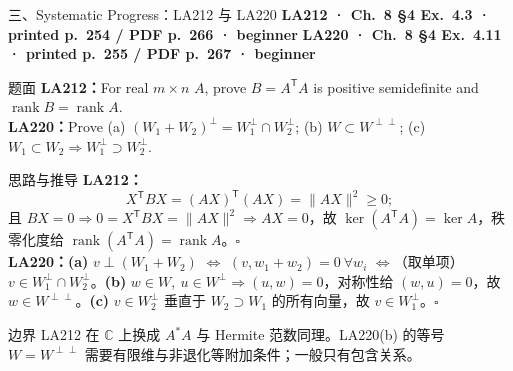 \documentclass[aspectratio=169,10pt,fontset=none]{ctexbeamer}
\newcommand{\ex}[1]{\textcolor{accent}{\footnotesize\bfseries #1}}
\begin{document}
\begin{frame}[t]{三、Systematic Progress：LA212 与 LA220}
  \leavevmode\ex{LA212 · Ch.~8 §4 Ex.~4.3 · printed p.~254 / PDF p.~266 · beginner}\quad
  \ex{LA220 · Ch.~8 §4 Ex.~4.11 · printed p.~255 / PDF p.~267 · beginner}
  \begin{block}{\footnotesize 题面}
    \scriptsize \textbf{LA212：}For real $m\times n$ $A$, prove $B=A^{\mathsf T}A$ is positive semidefinite and $\operatorname{rank}B=\operatorname{rank}A$.\\
    \textbf{LA220：}Prove (a) $(W_1+W_2)^\perp=W_1^\perp\cap W_2^\perp$; (b) $W\subset W^{\perp\perp}$; (c) $W_1\subset W_2\Rightarrow W_1^\perp\supset W_2^\perp$.
  \end{block}
  \begin{exampleblock}{\footnotesize 思路与推导}
    \scriptsize
    \textbf{LA212：}
    $$X^{\mathsf T}BX=(AX)^{\mathsf T}(AX)=\lVert AX\rVert^2\ge0;$$
    且 $BX=0\Rightarrow0=X^{\mathsf T}BX=\lVert AX\rVert^2\Rightarrow AX=0$，故 $\ker(A^{\mathsf T}A)=\ker A$，秩零化度给 $\operatorname{rank}(A^{\mathsf T}A)=\operatorname{rank}A$。$\square$\\[2pt]
    \textbf{LA220：(a)} $v\perp(W_1+W_2)$ $\Leftrightarrow$ $(v,w_1+w_2)=0\ \forall w_i$ $\Leftrightarrow$（取单项）$v\in W_1^\perp\cap W_2^\perp$。\textbf{(b)} $w\in W,\ u\in W^\perp\Rightarrow(u,w)=0$，对称性给 $(w,u)=0$，故 $w\in W^{\perp\perp}$。\textbf{(c)} $v\in W_2^\perp$ 垂直于 $W_2\supset W_1$ 的所有向量，故 $v\in W_1^\perp$。$\square$
  \end{exampleblock}
  \begin{block}{\footnotesize 边界}
    \scriptsize LA212 在 $\mathbb C$ 上换成 $A^*A$ 与 Hermite 范数同理。LA220(b) 的等号 $W=W^{\perp\perp}$ 需要有限维与非退化等附加条件；一般只有包含关系。
  \end{block}
\end{frame}
\end{document}
